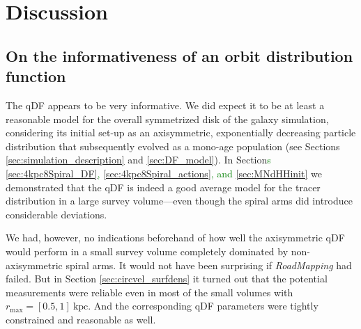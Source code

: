 \documentclass[iop,revtex4,numberedappendix,appendixfloats]{emulateapj}
\newcommand{\RM}{{\sl RoadMapping}}
\newcommand{\NEW}[1]{\textcolor{Green}{#1}}
\newcommand{\hiddenComment}[1]{}
\newcommand{\OLD}[1]{}
\begin{document}
\hiddenComment{[TO DO: HW writes about the above discussion: "We should discuss this. I am still not 100\% sure I get the point. Is the fact that we predict the potential far away from most stars correctly a consequence of having used a clever functional form.." Jo writes: "Probably comes from the fact that the N-body model was setup with a simple model for the Milky Way. But I think we can just not discuss this in the current paper."]}

\section{Discussion} \label{sec:discussion}

\subsection{On the informativeness of an orbit distribution function}

The qDF appears to be very informative. We did expect it to be at least a reasonable model for the overall symmetrized disk of the galaxy simulation, considering its initial set-up as an axisymmetric, exponentially decreasing particle distribution that subsequently evolved as a mono-age population (see Sections \ref{sec:simulation_description} and \ref{sec:DF_model}). In Section\NEW{s} \ref{sec:4kpc8Spiral_DF}\NEW{,}\OLD{ and} \ref{sec:4kpc8Spiral_actions}\NEW{, and \ref{sec:MNdHHinit}} we demonstrated that the qDF is indeed a good average model for the tracer distribution in a large survey volume---even though the spiral arms did introduce considerable deviations.

We had, however, no indications beforehand of how well the axisymmetric qDF would perform in a small survey volume completely dominated by non-axisymmetric spiral arms. It would not have been surprising if \RM{} had failed. But in Section \ref{sec:circvel_surfdens} it turned out that the potential measurements were reliable even in most of the small volumes with $r_\text{max}=[0.5,1]~\text{kpc}$. And the corresponding qDF parameters were tightly constrained and reasonable as well. 
\end{document}
